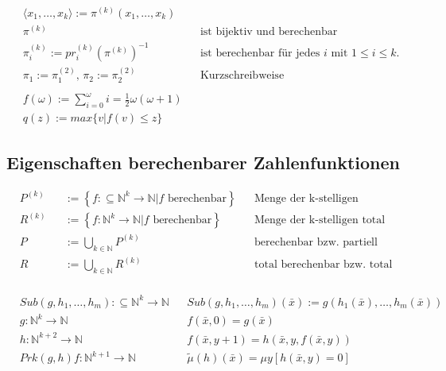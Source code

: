 \documentclass[10pt,oneside,a4paper]{scrartcl}
\begin{document}

    \begin{align}
    &\langle x_1, \ldots, x_k\rangle := \pi^{(k)}(x_1, \ldots, x_k)\\
    &\pi^{(k)} && \text{ist bijektiv und berechenbar}\\
    &\pi_i^{(k)} := pr_i^{(k)}(\pi^{(k)})^{-1}
        && \text{ist berechenbar für jedes $i$ mit $1 \leq i \leq k$.}\\
    &\pi_1 := \pi_1^{(2)}\text{, }\pi_2 := \pi_2^{(2)}
        && \text{Kurzschreibweise}\nonumber\\
    \nonumber\\
    &f(\omega) := \sum_{i=0}^{\omega} i = \frac{1}{2} \omega (\omega+1)\\
    &q(z) := max\{v|f(v) \leq z\}
    \end{align}

\subsection{Eigenschaften berechenbarer Zahlenfunktionen}

    \begin{align}
    &P^{(k)} &&:= \left\{f :\subseteq\mathbb{N}^k\longrightarrow
        \mathbb{N} | f \text{ berechenbar}\right\} 
                  && \text{Menge der k-stelligen berechenbaren Funktionen} \\
    &R^{(k)} &&:= \left\{f :\mathbb{N}^k\longrightarrow
        \mathbb{N} | f \text{ berechenbar}\right\}
                  && \text{Menge der k-stelligen total rekursiven Funktionen}\\
    &P &&:= \bigcup_{k\in\mathbb{N}} P^{(k)}
        && \text{berechenbar bzw. partiell rekursiv}\\
    &R &&:= \bigcup_{k\in\mathbb{N}} R^{(k)}
        && \text{total berechenbar bzw. total rekursiv}\\
    \end{align}

    \begin{align}
    &Sub(g, h_1, \ldots, h_m) :\subseteq\mathbb{N}^k\longrightarrow \mathbb{N}
        &&Sub(g, h_1, \ldots, h_m)(\bar{x}) := g(h_1(\bar{x}), \ldots,
            h_m(\bar{x}))\\
    &g:\mathbb{N}^{k}\longrightarrow \mathbb{N} && f(\bar{x}, 0) = g(\bar{x})\\
    &h:\mathbb{N}^{k+2}\longrightarrow \mathbb{N} && f(\bar{x}, y+1) = h(
        \bar{x}, y, f(\bar{x}, y))\\
    &Prk(g,h) f : \mathbb{N}^{k+1} \longrightarrow \mathbb{N}
        &&\tilde{\mu}(h)(\bar{x}) = \mu y \left[ h(\bar{x}, y) = 0 \right]
    \end{align}
\end{document}
